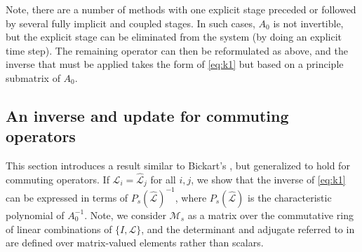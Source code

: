 \documentclass[review]{siamart}
\begin{document}
Note, there are a number of methods with one explicit stage preceded or followed by several
fully implicit and coupled stages. In such cases, $A_0$ is
not invertible, but the explicit stage can be eliminated from the system (by doing an explicit
time step). The remaining operator can then be reformulated as above, and the inverse that
must be applied takes the form of \eqref{eq:k1} but based on a principle submatrix of $A_0$.

\subsection{An inverse and update for commuting operators}\label{sec:solve:inv}

This section introduces a result similar to Bickart's \cite{bickart77},
but generalized to hold for commuting
operators. If $\widehat{\mathcal{L}}_i=\widehat{\mathcal{L}}_j$ for all $i,j$, we show that
the inverse of \eqref{eq:k1} can be expressed in terms of $P_s(\widehat{\mathcal{L}})^{-1}$,
where $P_s(\widehat{\mathcal{L}})$ is the characteristic polynomial of $A_0^{-1}$. Note, we
consider $\mathcal{M}_s$ as a matrix over the commutative ring of linear combinations of
$\{I, \mathcal{L}\}$, and the determinant and adjugate referred to in
 are defined over matrix-valued elements rather than scalars.
\end{document}
